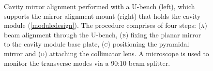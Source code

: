 \documentclass[../Thesis-IJspeert.tex]{subfiles}
\begin{document}
\begin{figure}[t]
\caption[Cavity mirror alignment procedure]{Cavity mirror alignment performed with a U-bench (left), which supports the mirror alignment mount (right) that holds the cavity module (\autoref{moduledesign}). The procedure comprises of four steps: (\textsc{a}) beam alignment through the U-bench, (\textsc{b}) fixing the planar mirror to the cavity module base plate, (\textsc{c}) positioning the pyramidal mirror and (\textsc{d}) attaching the collimator lens. A microscope is used to monitor the transverse modes via a 90:10 beam splitter.}
\label{alignmentprocedure}
\end{figure}
\end{document}
